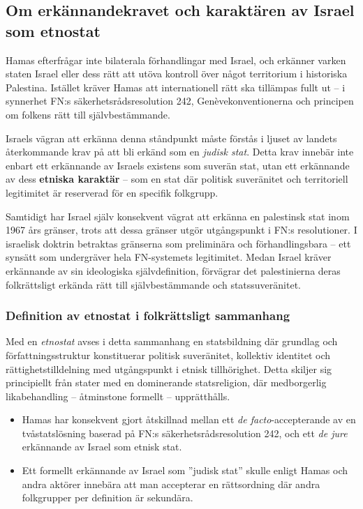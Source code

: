 \subsection{Om erkännandekravet och karaktären av Israel som etnostat}

Hamas efterfrågar inte bilaterala förhandlingar med Israel, och erkänner varken staten Israel eller dess rätt att utöva kontroll över något territorium i historiska Palestina. Istället kräver Hamas att internationell rätt ska tillämpas fullt ut – i synnerhet FN:s säkerhetsrådsresolution 242, Genèvekonventionerna och principen om folkens rätt till självbestämmande. 

Israels vägran att erkänna denna ståndpunkt måste förstås i ljuset av landets återkommande krav på att bli erkänd som en \textit{judisk stat}. Detta krav innebär inte enbart ett erkännande av Israels existens som suverän stat, utan ett erkännande av dess \textbf{etniska karaktär} – som en stat där politisk suveränitet och territoriell legitimitet är reserverad för en specifik folkgrupp.

Samtidigt har Israel själv konsekvent vägrat att erkänna en palestinsk stat inom 1967 års gränser, trots att dessa gränser utgör utgångspunkt i FN:s resolutioner. I israelisk doktrin betraktas gränserna som preliminära och förhandlingsbara – ett synsätt som undergräver hela FN-systemets legitimitet. Medan Israel kräver erkännande av sin ideologiska självdefinition, förvägrar det palestinierna deras folkrättsligt erkända rätt till självbestämmande och statssuveränitet.


\subsubsection*{Definition av etnostat i folkrättsligt sammanhang}

Med en \textit{etnostat} avses i detta sammanhang en statsbildning där grundlag och författningsstruktur konstituerar politisk suveränitet, kollektiv identitet och rättighetstilldelning med utgångspunkt i etnisk tillhörighet. Detta skiljer sig principiellt från stater med en dominerande statsreligion, där medborgerlig likabehandling – åtminstone formellt – upprätthålls.

\begin{itemize}
  \item Hamas har konsekvent gjort åtskillnad mellan ett \textit{de facto}-accepterande av en tvåstatslösning baserad på FN:s säkerhetsrådsresolution 242, och ett \textit{de jure} erkännande av Israel som etnisk stat. 
  \item Ett formellt erkännande av Israel som ”judisk stat” skulle enligt Hamas och andra aktörer innebära att man accepterar en rättsordning där andra folkgrupper per definition är sekundära.
\end{itemize}

